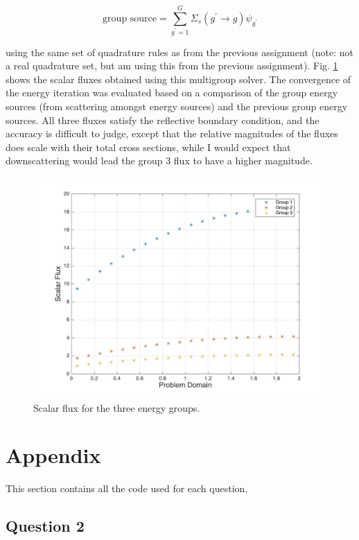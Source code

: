 \documentclass[10pt]{article}
\begin{document}
\begin{equation}
\text{group source}=\sum_{g^{'}=1}^G\Sigma_s(g^{'}\rightarrow g)\psi_{g^{'}}
\end{equation}

using the same set of quadrature rules as from the previous assignment (note: not a real quadrature set, but am using this from the previous assignment). Fig. \ref{fig:1} shows the scalar fluxes obtained using this multigroup solver. The convergence of the energy iteration was evaluated based on a comparison of the group energy sources (from scattering amongst energy sources) and the previous group energy sources. All three fluxes satisfy the reflective boundary condition, and the accuracy is difficult to judge, except that the relative magnitudes of the fluxes does scale with their total cross sections, while I would expect that downscattering would lead the group 3 flux to have a higher magnitude.

\begin{figure}[H]
  \centering
  \includegraphics[width=12cm]{ScalarFlux_3Group.jpg} %
  \caption{Scalar flux for the three energy groups.}
  \label{fig:1}
\end{figure}

\section{Appendix}
This section contains all the code used for each question. 

\subsection{Question 2}

\end{document}
